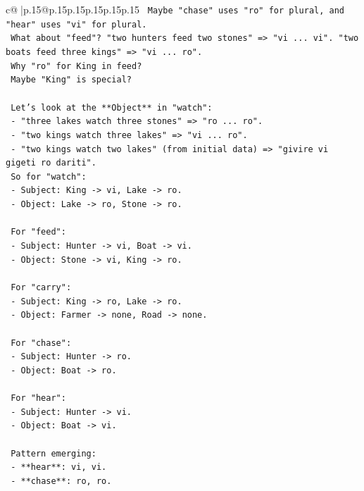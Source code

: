 \documentclass{article}
\begin{document}
{\begin{supertabular}{c@{$\;$}|p{.15\linewidth}@{}p{.15\linewidth}p{.15\linewidth}p{.15\linewidth}p{.15\linewidth}p{.15\linewidth}}
{{{\texttt{    Maybe "chase" uses "ro" for plural, and "hear" uses "vi" for plural.} \\
\texttt{    What about "feed"? "two hunters feed two stones" => "vi ... vi". "two boats feed three kings" => "vi ... ro".} \\
\texttt{    Why "ro" for King in feed?} \\
\texttt{    Maybe "King" is special?} \\
\\ 
\texttt{    Let's look at the **Object** in "watch":} \\
\texttt{    {-} "three lakes watch three stones" => "ro ... ro".} \\
\texttt{    {-} "two kings watch three lakes" => "vi ... ro".} \\
\texttt{    {-} "two kings watch two lakes" (from initial data) => "givire vi gigeti ro dariti".} \\
\texttt{    So for "watch":} \\
\texttt{    {-} Subject: King {-}> vi, Lake {-}> ro.} \\
\texttt{    {-} Object: Lake {-}> ro, Stone {-}> ro.} \\
\\ 
\texttt{    For "feed":} \\
\texttt{    {-} Subject: Hunter {-}> vi, Boat {-}> vi.} \\
\texttt{    {-} Object: Stone {-}> vi, King {-}> ro.} \\
\\ 
\texttt{    For "carry":} \\
\texttt{    {-} Subject: King {-}> ro, Lake {-}> ro.} \\
\texttt{    {-} Object: Farmer {-}> none, Road {-}> none.} \\
\\ 
\texttt{    For "chase":} \\
\texttt{    {-} Subject: Hunter {-}> ro.} \\
\texttt{    {-} Object: Boat {-}> ro.} \\
\\ 
\texttt{    For "hear":} \\
\texttt{    {-} Subject: Hunter {-}> vi.} \\
\texttt{    {-} Object: Boat {-}> vi.} \\
\\ 
\texttt{    Pattern emerging:} \\
\texttt{    {-} **hear**: vi, vi.} \\
\texttt{    {-} **chase**: ro, ro.} \\
}}}
\end{supertabular}}
\end{document}
